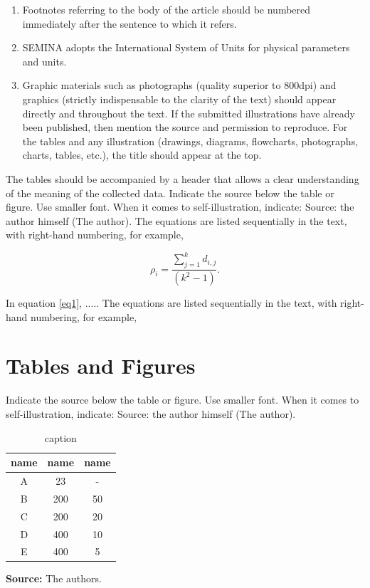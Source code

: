 \documentclass[article,10pt,twoside,a4paper,twocolumn,hidelinks,english,brazil]{abntex2}
\begin{document}
\begin{enumerate}
     \item 	Footnotes referring to the body of the article should be numbered immediately after the sentence to which it refers.
     \item 	SEMINA adopts the International System of Units for physical parameters and units.
     \item 	Graphic materials such as photographs (quality superior to 800dpi) and graphics (strictly indispensable to the clarity of the text) should appear directly and throughout the text. If the submitted illustrations have already been published, then mention the source and permission to reproduce. For the tables and any illustration (drawings, diagrams, flowcharts, photographs, charts, tables, etc.), the title should appear at the top.
\end{enumerate}

The tables should be accompanied by a header that allows a clear understanding of the meaning of the collected data.
Indicate the source below the table or figure. Use smaller font. When it comes to self-illustration, indicate: Source: the author himself (The author).
      The equations are listed sequentially in the text, with right-hand numbering, for example,

\begin{equation}
\label{eq1}
\rho_i=\frac{\sum^{k}_{j=1} d_{i,j}}{(k^2-1)}.
\end{equation}

In equation \ref{eq1}, .....
      The equations are listed sequentially in the text, with right-hand numbering, for example,
%


\section*{Tables and Figures }

Indicate the source below the table or figure. Use smaller font. When it comes to self-illustration, indicate: Source: the author himself (The author).

\begin{table}[!htpp]
	\vspace{0.3cm}
  \caption{ caption }
	\vspace{-0.6cm}
	\label{tab01}
	\renewcommand{\arraystretch}{1.2}
	\begin{center}
\begin{tabular}{ccc}
\hline
\textbf{name } &	\textbf{name  }	& \textbf{name }\\
\hline		
A	&23	&- \\
B	&200	&50\\
C	&200	&20\\
D	&400	&10\\
E	&400	&5\\
\hline
\end{tabular}
\end{center}
\small\textbf{Source:} The authors.
\end{table}
\end{document}

